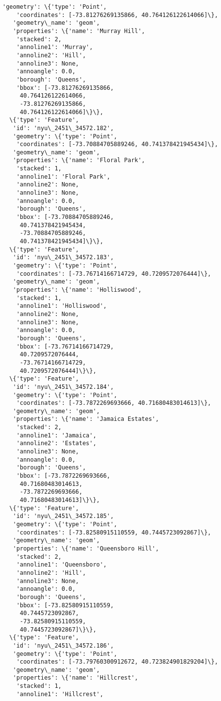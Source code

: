 \documentclass[11pt]{article}
\begin{document}
\begin{tcolorbox}[breakable, size=fbox, boxrule=.5pt, pad at break*=1mm, opacityfill=0]
\begin{Verbatim}[commandchars=\\\{\}]
   'geometry': \{'type': 'Point',
    'coordinates': [-73.81276269135866, 40.764126122614066]\},
   'geometry\_name': 'geom',
   'properties': \{'name': 'Murray Hill',
    'stacked': 2,
    'annoline1': 'Murray',
    'annoline2': 'Hill',
    'annoline3': None,
    'annoangle': 0.0,
    'borough': 'Queens',
    'bbox': [-73.81276269135866,
     40.764126122614066,
     -73.81276269135866,
     40.764126122614066]\}\},
  \{'type': 'Feature',
   'id': 'nyu\_2451\_34572.182',
   'geometry': \{'type': 'Point',
    'coordinates': [-73.70884705889246, 40.741378421945434]\},
   'geometry\_name': 'geom',
   'properties': \{'name': 'Floral Park',
    'stacked': 1,
    'annoline1': 'Floral Park',
    'annoline2': None,
    'annoline3': None,
    'annoangle': 0.0,
    'borough': 'Queens',
    'bbox': [-73.70884705889246,
     40.741378421945434,
     -73.70884705889246,
     40.741378421945434]\}\},
  \{'type': 'Feature',
   'id': 'nyu\_2451\_34572.183',
   'geometry': \{'type': 'Point',
    'coordinates': [-73.76714166714729, 40.7209572076444]\},
   'geometry\_name': 'geom',
   'properties': \{'name': 'Holliswood',
    'stacked': 1,
    'annoline1': 'Holliswood',
    'annoline2': None,
    'annoline3': None,
    'annoangle': 0.0,
    'borough': 'Queens',
    'bbox': [-73.76714166714729,
     40.7209572076444,
     -73.76714166714729,
     40.7209572076444]\}\},
  \{'type': 'Feature',
   'id': 'nyu\_2451\_34572.184',
   'geometry': \{'type': 'Point',
    'coordinates': [-73.7872269693666, 40.71680483014613]\},
   'geometry\_name': 'geom',
   'properties': \{'name': 'Jamaica Estates',
    'stacked': 2,
    'annoline1': 'Jamaica',
    'annoline2': 'Estates',
    'annoline3': None,
    'annoangle': 0.0,
    'borough': 'Queens',
    'bbox': [-73.7872269693666,
     40.71680483014613,
     -73.7872269693666,
     40.71680483014613]\}\},
  \{'type': 'Feature',
   'id': 'nyu\_2451\_34572.185',
   'geometry': \{'type': 'Point',
    'coordinates': [-73.82580915110559, 40.7445723092867]\},
   'geometry\_name': 'geom',
   'properties': \{'name': 'Queensboro Hill',
    'stacked': 2,
    'annoline1': 'Queensboro',
    'annoline2': 'Hill',
    'annoline3': None,
    'annoangle': 0.0,
    'borough': 'Queens',
    'bbox': [-73.82580915110559,
     40.7445723092867,
     -73.82580915110559,
     40.7445723092867]\}\},
  \{'type': 'Feature',
   'id': 'nyu\_2451\_34572.186',
   'geometry': \{'type': 'Point',
    'coordinates': [-73.79760300912672, 40.723824901829204]\},
   'geometry\_name': 'geom',
   'properties': \{'name': 'Hillcrest',
    'stacked': 1,
    'annoline1': 'Hillcrest',

\end{Verbatim}
\end{tcolorbox}
\end{document}
